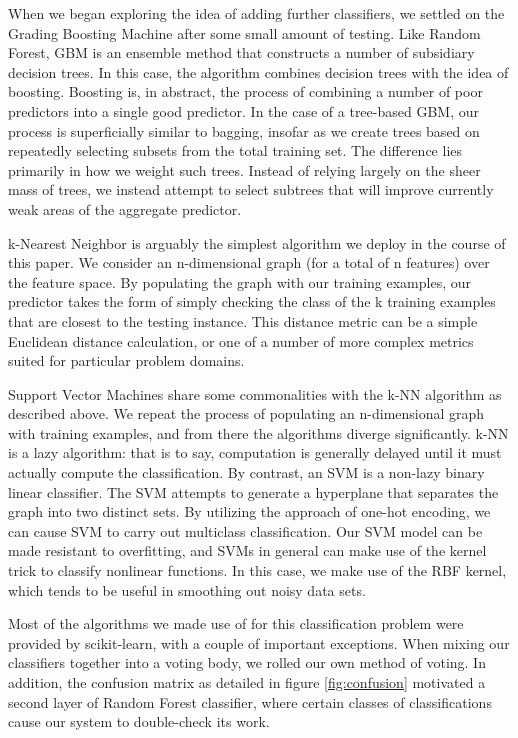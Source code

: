 When we began exploring the idea of adding further classifiers, we 
settled on the Grading Boosting Machine\cite{gbm} after some small 
amount of testing.  Like Random Forest, GBM is an ensemble method that 
constructs a number of subsidiary decision trees.  In this case, the 
algorithm combines decision trees with the idea of 
boosting\cite{boosting}.  Boosting is, in abstract, the process of 
combining a number of poor predictors into a single good predictor.  
In the case of a tree-based GBM, our process is superficially similar 
to bagging, insofar as we create trees based on repeatedly selecting 
subsets from the total training set.  The difference lies primarily in 
how we weight such trees.  Instead of relying largely on the sheer mass 
of trees, we instead attempt to select subtrees that will improve 
currently weak areas of the aggregate predictor.

k-Nearest Neighbor\cite{nearest} is arguably the simplest algorithm we 
deploy in the course of this paper.  We consider an n-dimensional 
graph (for a total of n features) over the feature space.  By populating 
the graph with our training examples, our predictor takes the form of 
simply checking the class of the k training examples that are closest 
to the testing instance.  This distance metric can be a simple 
Euclidean distance calculation, or one of a number of more complex 
metrics suited for particular problem domains.

Support Vector Machines\cite{support} share some commonalities with 
the k-NN algorithm as described above.  We repeat the process of 
populating an n-dimensional graph with training examples, and from 
there the algorithms diverge significantly.  k-NN is a lazy algorithm: 
that is to say, computation is generally delayed until it must actually 
compute the classification.  By contrast, an SVM is a non-lazy binary 
linear classifier.  The SVM attempts to generate a hyperplane that 
separates the graph into two distinct sets.  By utilizing the approach 
of one-hot encoding, we can cause SVM to carry out multiclass 
classification.  Our SVM model can be made resistant to overfitting, 
and SVMs in general can make use of the kernel trick to classify 
nonlinear functions.  In this case, we make use of the RBF\cite{rbf} 
kernel, which tends to be useful in smoothing out noisy data sets. 

Most of the algorithms we made use of for this classification problem 
were provided by scikit-learn, with a couple of important exceptions.  
When mixing our classifiers together into a voting body, we rolled our 
own method of voting.  In addition, the confusion matrix as detailed in 
figure \ref{fig:confusion} motivated a second layer of Random Forest 
classifier, where certain classes of classifications cause our system to 
double-check its work.  


